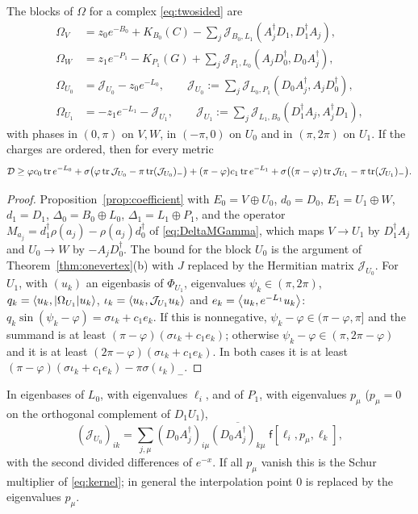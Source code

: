 \begin{proposition}\label{prop:twosidedcoefficient}
The blocks of $\Omega$ for a complex \eqref{eq:twosided} are
\begin{align*}
 \Omega_V&=z_0e^{-B_0}+K_{B_0}(C)-\sum_j\mathcal J_{B_0,L_1}(A_j^\dagger D_1,D_1^\dagger A_j),\\
 \Omega_W&=z_1e^{-P_1}-K_{P_1}(G)+\sum_j\mathcal J_{P_1,L_0}(A_jD_0^\dagger,D_0A_j^\dagger),\\
 \Omega_{U_0}&=\mathcal J_{U_0}-z_0e^{-L_0},\qquad
 \mathcal J_{U_0}:=\sum_j\mathcal J_{L_0,P_1}(D_0A_j^\dagger,A_jD_0^\dagger),\\
 \Omega_{U_1}&=-z_1e^{-L_1}-\mathcal J_{U_1},\qquad
 \mathcal J_{U_1}:=\sum_j\mathcal J_{L_1,B_0}(D_1^\dagger A_j,A_j^\dagger D_1),
\end{align*}
with phases in $(0,\pi)$ on $V,W$, in $(-\pi,0)$ on $U_0$ and in $(\pi,2\pi)$
on $U_1$. If the charges are ordered, then for every metric
\[
 \mathcal D\geq\varphi c_0\operatorname{tr} e^{-L_0}+\sigma\bigl(\varphi\operatorname{tr}\mathcal J_{U_0}-\pi\operatorname{tr}(\mathcal J_{U_0})_-\bigr)
 +(\pi-\varphi)c_1\operatorname{tr} e^{-L_1}+\sigma\bigl((\pi-\varphi)\operatorname{tr}\mathcal J_{U_1}-\pi\operatorname{tr}(\mathcal J_{U_1})_-\bigr).
\]
\end{proposition}

\begin{proof}
Proposition~\ref{prop:coefficient} with $E_0=V\oplus U_0$, $d_0=D_0$,
$E_1=U_1\oplus W$, $d_1=D_1$, $\Delta_0=B_0\oplus L_0$,
$\Delta_1=L_1\oplus P_1$, and the operator
$M_{a_j}=d_1^\dagger\rho(a_j)-\rho(a_j)d_0^\dagger$ of \eqref{eq:DeltaMGamma},
which maps $V\to U_1$ by $D_1^\dagger A_j$ and $U_0\to W$ by
$-A_jD_0^\dagger$. The bound for the block $U_0$ is the argument of
Theorem~\ref{thm:onevertex}(b) with $J$ replaced by the Hermitian matrix
$\mathcal J_{U_0}$. For $U_1$, with $(u_k)$ an eigenbasis of $\Phi_{U_1}$,
eigenvalues $\psi_k\in(\pi,2\pi)$, $q_k=\left\langle u_k,|\Omega_{U_1}|u_k\right\rangle$,
$\iota_k=\left\langle u_k,\mathcal J_{U_1}u_k\right\rangle$ and
$e_k=\left\langle u_k,e^{-L_1}u_k\right\rangle$:
$q_k\sin(\psi_k-\varphi)=\sigma\iota_k+c_1e_k$. If this is nonnegative,
$\psi_k-\varphi\in(\pi-\varphi,\pi]$ and the summand is at least
$(\pi-\varphi)(\sigma\iota_k+c_1e_k)$; otherwise
$\psi_k-\varphi\in(\pi,2\pi-\varphi)$ and it is at least
$(2\pi-\varphi)(\sigma\iota_k+c_1e_k)$. In both cases it is at least
$(\pi-\varphi)(\sigma\iota_k+c_1e_k)-\pi\sigma(\iota_k)_-$.
\end{proof}

In eigenbases of $L_0$, with eigenvalues $\ell_i$, and of $P_1$, with
eigenvalues $p_\mu$ ($p_\mu=0$ on the orthogonal complement of $D_1U_1$),
\[
 (\mathcal J_{U_0})_{ik}=\sum_{j,\mu}(D_0A_j^\dagger)_{i\mu}\overline{(D_0A_j^\dagger)_{k\mu}}\;
 \mathsf f[\ell_i,p_\mu,\ell_k],
\]
with the second divided differences of $e^{-x}$. If all $p_\mu$ vanish this
is the Schur multiplier of \eqref{eq:kernel}; in general the interpolation
point $0$ is replaced by the eigenvalues $p_\mu$.

